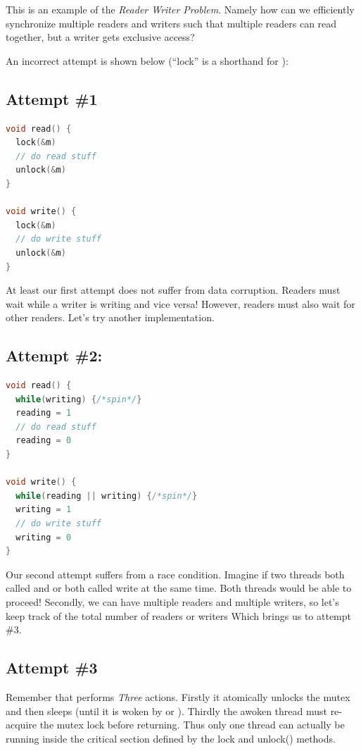 This is an example of the \emph{Reader Writer Problem}.
Namely how can we efficiently synchronize multiple readers and writers such that multiple readers can read together, but a writer gets exclusive access?

An incorrect attempt is shown below (``lock'' is a shorthand for ):

\subsection{Attempt \#1}

\begin{lstlisting}[language=C]
void read() {
  lock(&m)
  // do read stuff
  unlock(&m)
}

void write() {
  lock(&m)
  // do write stuff
  unlock(&m)
}
\end{lstlisting}

At least our first attempt does not suffer from data corruption.
Readers must wait while a writer is writing and vice versa!
However, readers must also wait for other readers.
Let's try another implementation.

\subsection{Attempt \#2:}

\begin{lstlisting}[language=C]
void read() {
  while(writing) {/*spin*/}
  reading = 1
  // do read stuff
  reading = 0
}

void write() {
  while(reading || writing) {/*spin*/}
  writing = 1
  // do write stuff
  writing = 0
}
\end{lstlisting}

Our second attempt suffers from a race condition.
Imagine if two threads both called  and  or both called write at the same time.
Both threads would be able to proceed!
Secondly, we can have multiple readers and multiple writers, so let's keep track of the total number of readers or writers
Which brings us to attempt \#3.

\subsection{Attempt \#3}

Remember that  performs \emph{Three} actions.
Firstly it atomically unlocks the mutex and then sleeps (until it is woken by  or ).
Thirdly the awoken thread must re-acquire the mutex lock before returning.
Thus only one thread can actually be running inside the critical section defined by the lock and unlock() methods.

